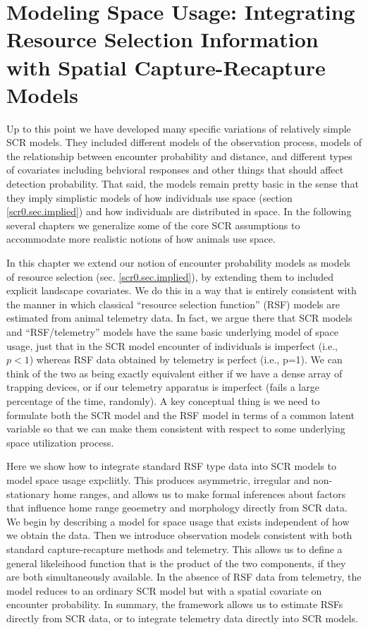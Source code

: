 \chapter{
Modeling Space Usage: 
Integrating Resource Selection Information with 
Spatial Capture-Recapture
  Models}

\label{chapt.rsf}


\vspace{.3in}

Up to this point we have developed many specific variations of
relatively simple SCR models. They included different models of the
observation process, models of the relationship between encounter
probability and distance, and different types of covariates including
behvioral responses and other things that should affect detection
probability.  That said, the models remain pretty basic in the sense
that they imply simplistic models of how individuals use space
(section \ref{scr0.sec.implied}) and how individuals are distributed
in space.  In the following several chapters we generalize some of the
core SCR assumptions to accommodate more realistic notions of how
animals use space.

In this chapter we extend our notion of encounter probability models
as models of resource selection (sec. \ref{scr0.sec.implied}), by
extending them to included explicit landscape covariates. We do this
in a way that is entirely consistent with the manner in which
classical ``resource selection function'' (RSF) models are estimated
from animal telemetry data.  In fact, we argue there that SCR models
and ``RSF/telemetry'' models have the same basic underlying model of
space usage, just that in the SCR model encounter of individuals is
imperfect (i.e., $p<1$) whereas RSF data obtained by telemetry is
perfect (i.e., p=1). We can think of the two as being exactly
equivalent either if we have a dense array of trapping devices, or if
our telemetry apparatus is imperfect (fails a large percentage of the
time, randomly).  A key conceptual thing is we need to formulate both
the SCR model and the RSF model in terms of a common latent variable
so that we can make them consistent with respect to some underlying
space utilization process.


Here we show how to integrate standard RSF type data into SCR models
to model space usage expcliitly. This produces asymmetric, irregular
and non-stationary home ranges, and allows us to make formal
inferences about factors that influence home range geoemetry and
morphology directly from SCR data.  We begin by describing a model for
space usage that exists independent of how we obtain the data. Then we
introduce observation models consistent with both standard
capture-recapture methods and telemetry.  This allows us to define a
general likeleihood function that is the product of the two
components, if they are both simultaneously available.  In the absence
of RSF data from telemetry, the model reduces to an ordinary SCR model
but with a spatial covariate on encounter probability.  In summary,
the framework allows us to estimate RSFs directly from SCR data, or to
integrate telemetry data directly into SCR models.






